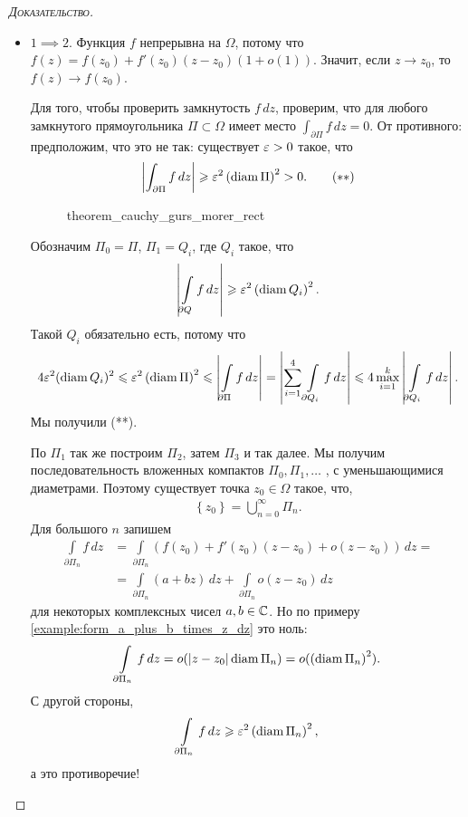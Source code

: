 \begin{proof}[\normalfont\textsc{Доказательство}]\
 \begin{itemize}
  \item $1 \implies 2$. Функция $f$ непрерывна на $\Omega$, потому что $f(z) = f(z_0) + f'(z_0)(z-z_0)(1+o(1))$. Значит, если $z \to z_0$, то $f(z) \to f(z_0)$.

 Для того, чтобы проверить замкнутость $f \, dz$, проверим, что для любого замкнутого прямоугольника $\Pi \subset \Omega$ имеет место $\int_{\partial\Pi} f\,dz =0 $. От противного: предположим, что это не так: существует $\varepsilon > 0$ такое, что 
\begin{align*}
 \left|\int_{\partial\Pi} f\,dz  \right|  \geqslant \varepsilon^{2}\left( \operatorname{diam} \Pi \right)^{2} > 0. \qquad ( \ast\ast )
\end{align*}
\begin{figure}[ht]
    \centering
    \caption{theorem_cauchy_gurs_morer_rect}
    \label{fig:theorem_cauchy_gurs_morer_rect}
\end{figure}

 Обозначим $\Pi_0 = \Pi$, $\Pi_1 = Q_i$, где $Q_i$ такое, что 
 \begin{align*}
  \left| \int\limits_{\partial Q}  f\,dz \right| \geqslant \varepsilon^{2} \left( \operatorname{diam} Q_i \right)^{2}.
 \end{align*} Такой $Q_i$ обязательно есть, потому что
 \begin{align*}
  4\varepsilon^{2}(\operatorname{diam} Q_i)^{2} \leqslant \varepsilon^{2} \left( \operatorname{diam} \Pi \right)^{2} \leqslant \left| \int\limits_{\partial \Pi} f\,dz   \right| = \left| \sum_{i=1}^{4} \int\limits_{\partial Q_i} f\,dz    \right| \leqslant 4 \max_{i=1}^{k} \left| \int\limits_{\partial Q_i} f\,dz   \right|.
 \end{align*} Мы получили (**).

 По $\Pi_1$ так же построим $\Pi_2$, затем $\Pi_3$ и так далее. Мы получим последовательность вложенных компактов  $\Pi_0, \Pi_1, \ldots$ , с уменьшающимися диаметрами. Поэтому существует точка $z_0 \in \Omega$ такое, что,
 \begin{align*}
  \left\{ z_0 \right\} = \bigcup_{n=0}^{\infty} \Pi_n.
 \end{align*} Для большого $n$ запишем
 \begin{align*}
  \int\limits_{\partial \Pi_n}  f\,dz &= \int\limits_{\partial\Pi_n}  \left( f(z_0) + f'(z_0)(z-z_0) + o(z - z_0) \right)\,dz = \\
  &= \int\limits_{\partial\Pi_n}  \left( a+bz \right)\,dz + \int\limits_{\partial\Pi_n}  o(z-z_0)\,dz
 \end{align*} для некоторых комплексных чисел $a,b \in \mathbb{C}$. Но по примеру \ref{example:form_a_plus_b_times_z_dz} это ноль:
 \begin{align*}
  \int\limits_{\partial\Pi_n} f\,dz  = o(\left| z-z_0 \right| \operatorname{diam} \Pi_n) = o(\left( \operatorname{diam} \Pi_n \right)^{2}).
 \end{align*} С другой стороны,
 \begin{align*}
  \int\limits_{\partial\Pi_n} f\,dz  \geqslant \varepsilon^{2}\left( \operatorname{diam} \Pi_n \right)^{2},
 \end{align*} а это противоречие!


\end{itemize}
\end{proof}
